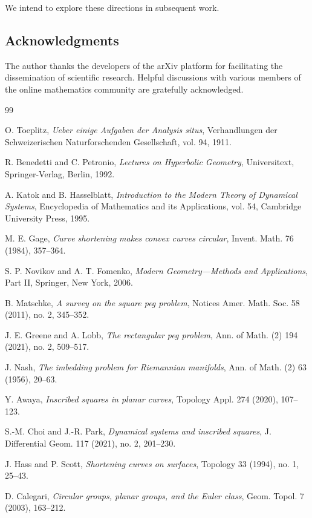 \documentclass{article}
\begin{document}
We intend to explore these directions in subsequent work.

\subsection*{Acknowledgments}
The author thanks the developers of the arXiv platform for facilitating the dissemination of scientific research. Helpful discussions with various members of the online mathematics community are gratefully acknowledged.

\begin{thebibliography}{99}

O. Toeplitz,
\emph{Ueber einige Aufgaben der Analysis situs},
Verhandlungen der Schweizerischen Naturforschenden Gesellschaft, vol. 94, 1911.

R. Benedetti and C. Petronio,
\emph{Lectures on Hyperbolic Geometry},
Universitext, Springer-Verlag, Berlin, 1992.

A. Katok and B. Hasselblatt,
\emph{Introduction to the Modern Theory of Dynamical Systems},
Encyclopedia of Mathematics and its Applications, vol. 54, Cambridge University Press, 1995.

M. E. Gage,
\emph{Curve shortening makes convex curves circular},
Invent. Math. 76 (1984), 357–364.

S. P. Novikov and A. T. Fomenko,
\emph{Modern Geometry—Methods and Applications},
Part II, Springer, New York, 2006.

B. Matschke,
\emph{A survey on the square peg problem},
Notices Amer. Math. Soc. 58 (2011), no. 2, 345–352.

J. E. Greene and A. Lobb,
\emph{The rectangular peg problem},
Ann. of Math. (2) 194 (2021), no. 2, 509–517.

J. Nash,
\emph{The imbedding problem for Riemannian manifolds},
Ann. of Math. (2) 63 (1956), 20–63.

Y. Awaya,
\emph{Inscribed squares in planar curves},
Topology Appl. 274 (2020), 107–123.

S.-M. Choi and J.-R. Park,
\emph{Dynamical systems and inscribed squares},
J. Differential Geom. 117 (2021), no. 2, 201–230.

J. Hass and P. Scott,
\emph{Shortening curves on surfaces},
Topology 33 (1994), no. 1, 25–43.

D. Calegari,
\emph{Circular groups, planar groups, and the Euler class},
Geom. Topol. 7 (2003), 163–212.

\end{thebibliography}
\end{document}
